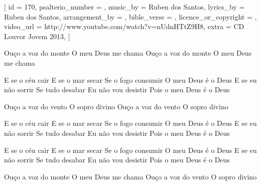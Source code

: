 
[
    id                     = {170},
    psalterio_number       = {},
    music_by               = {Ruben dos Santos},
    lyrics_by              = {Ruben dos Santos},
    arrangement_by         = {},
    bible_verse            = {},
    licence_or_copyright   = {},
    video_url              = {http://www.youtube.com/watch?v=nUdnHTtZ9H8},
    extra                  = {CD Louvor Jovem 2013},
]

\beginverse
Ouço a voz do monte
O meu Deus me chama
Ouço a voz do monte
O meu Deus me chama
\endverse


\beginchorus
E se o céu cair
E se o mar secar
Se o fogo consumir
O meu Deus é o Deus
E se eu não sorrir
Se tudo desabar
Eu não vou desistir
Pois o meu Deus é o Deus
\endchorus


\beginverse
Ouço a voz do vento
O sopro divino
Ouço a voz do vento
O sopro divino
\endverse


\beginchorus
E se o céu cair
E se o mar secar
Se o fogo consumir
O meu Deus é o Deus
E se eu não sorrir
Se tudo desabar
Eu não vou desistir
Pois o meu Deus é o Deus
\endchorus


\beginchorus
E se o céu cair
E se o mar secar
Se o fogo consumir
O meu Deus é o Deus
E se eu não sorrir
Se tudo desabar
Eu não vou desistir
Pois o meu Deus é o Deus
\endchorus


\beginverse
Ouço a voz do monte
O meu Deus me chama
Ouço a voz do vento
O sopro divino
\endverse

\endsong
